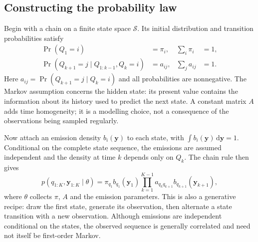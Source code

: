 \subsection{Constructing the probability law}

Begin with a chain on a finite state space $\mathcal S$. Its initial distribution and
transition probabilities satisfy
\begin{equation}
 \begin{aligned}
 \Pr(Q_1=i)&=\pi_i,&\sum_i\pi_i&=1,\\
 \Pr(Q_{k+1}=j\mid Q_{1:k-1},Q_k=i)&=a_{ij},&\sum_j a_{ij}&=1.
 \end{aligned}
 \label{eq:hmm-markov}
\end{equation}
Here $a_{ij}=\Pr(Q_{k+1}=j\mid Q_k=i)$ and all probabilities are nonnegative. The Markov assumption concerns the hidden state:
its present value contains the information about its history used to predict the next
state. A constant matrix $A$ adds time homogeneity; it is a modelling choice, not a
consequence of the observations being sampled regularly.

Now attach an emission density $b_i(\mathbf y)$ to each state, with
$\int b_i(\mathbf y)\,\mathrm d\mathbf y=1$. Conditional on the complete state sequence,
the emissions are assumed independent and the density at time $k$ depends only on $Q_k$.
The chain rule then gives
\begin{equation}
 p(q_{1:K},\mathbf y_{1:K}\mid\theta)
 =\pi_{q_1}b_{q_1}(\mathbf y_1)
   \prod_{k=1}^{K-1}a_{q_kq_{k+1}}b_{q_{k+1}}(\mathbf y_{k+1}),
 \label{eq:hmmjoint}
\end{equation}
where $\theta$ collects $\pi$, $A$ and the emission parameters. This is also a generative
recipe: draw the first state, generate its observation, then alternate a state transition
with a new observation. Although emissions are independent conditional on the states,
the observed sequence is generally correlated and need not itself be first-order Markov.

